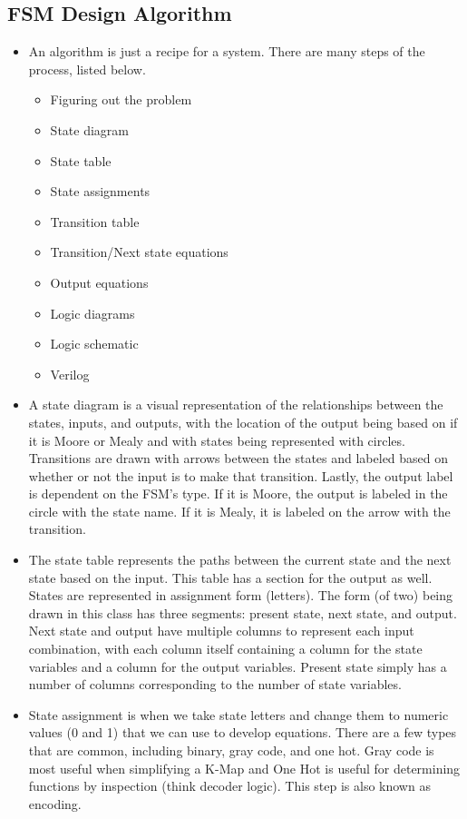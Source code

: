 \documentclass[10pt,a4paper]{article}
\begin{document}
\subsection{FSM Design Algorithm}
\begin{itemize}
\item An algorithm is just a recipe for a system. There are many steps of the process, listed below.
\begin{itemize}
\item Figuring out the problem
\item State diagram
\item State table
\item State assignments
\item Transition table
\item Transition/Next state equations
\item Output equations
\item Logic diagrams
\item Logic schematic
\item Verilog
\end{itemize}
\item A state diagram is a visual representation of the relationships between the states, inputs, and outputs, with the location of the output being based on if it is Moore or Mealy and with states being represented with circles. Transitions are drawn with arrows between the states and labeled based on whether or not the input is to make that transition. Lastly, the output label is dependent on the FSM's type. If it is Moore, the output is labeled in the circle with the state name. If it is Mealy, it is labeled on the arrow with the transition.
\item The state table represents the paths between the current state and the next state based on the input. This table has a section for the output as well. States are represented in assignment form (letters). The form (of two) being drawn in this class has three segments: present state, next state, and output. Next state and output have multiple columns to represent each input combination, with each column itself containing a column for the state variables and a column for the output variables. Present state simply has a number of columns corresponding to the number of state variables. 
\item State assignment is when we take state letters and change them to numeric values (0 and 1) that we can use to develop equations. There are a few types that are common, including binary, gray code, and one hot. Gray code is most useful when simplifying a K-Map and One Hot is useful for determining functions by inspection (think decoder logic). This step is also known as encoding. 

\end{itemize}
\end{document}

